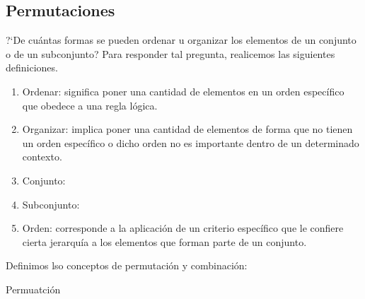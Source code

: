 \subsection{Permutaciones}

?`De cu\'antas formas se pueden ordenar u organizar los elementos de un conjunto o de un subconjunto? Para responder tal pregunta, realicemos
las siguientes definiciones. 
\begin{definition}
    \hspace{0.5mm}
    \begin{enumerate}[{\rm 1.}]        
        \item {\rm Ordenar: } significa poner una cantidad de elementos en un orden espec\'ifico que obedece a una regla l\'ogica.
        \item {\rm Organizar: } implica poner una cantidad de elementos de forma que no tienen un orden espec\'ifico o dicho orden no es importante 
        dentro de un determinado contexto.
        \item {\rm Conjunto: } 
        \item {\rm Subconjunto: } 
        \item {\rm Orden: } corresponde a la aplicaci\'on de un criterio espec\'ifico que le confiere cierta jerarqu\'ia a los elementos que forman parte de un conjunto. 
        
    \end{enumerate}
\end{definition}

Definimos lso conceptos de permutaci\'on y combinaci\'on: 

\begin{definition}{Permuatci\'on}

\end{definition}

